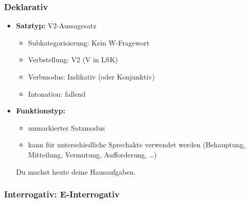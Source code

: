 \begin{frame}
\frametitle{Deklarativ}

\begin{itemize}
	\item \textbf{Satztyp:} V2-Aussagesatz
	\begin{itemize}
		\item Subkategorisierung: Kein W-Fragewort
		\item Verbstellung: V2 (V in LSK)
		\item Verbmodus: Indikativ (oder Konjunktiv)
		\item Intonation: fallend
	\end{itemize}
	\item \textbf{Funktionstyp:}
	\begin{itemize}
		\item unmarkierter Satzmodus
		\item kann für unterschiedliche Sprechakte verwendet werden (Behauptung, Mitteilung, Vermutung, Aufforderung, \dots )
	\end{itemize}
	
	\ea Du machst heute deine Hausaufgaben.
	\z
	
\end{itemize}

\end{frame}


\subsubsection{Interrogativ: E-Interrogativ}



